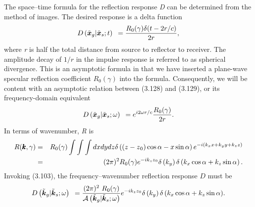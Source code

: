 The space--time formula for the reflection response \textit{D} can be determined from the method of images.  The desired response is a delta function
\begin{equation}\text{\textit{$D$}}\left(\tilde{\boldsymbol{x}}_g|\tilde{\boldsymbol{x}}_s;\text{\textit{$t$}}\right)\text{
 }= \frac{\text{\textit{$R$}}_0(\gamma ) \delta (\text{\textit{$t$}}-2\text{\textit{$r$}}/\text{\textit{$c$}})}{2\text{\textit{$r$}}},\end{equation}
where \textit{r} is half the total distance from source to reflector to receiver. The amplitude decay of $1{/}r$ in the impulse response is referred to as spherical divergence. This is an asymptotic formula in that we have inserted a plane-wave specular reflection coefficient
\(R_0(\gamma )\) into the formula. Consequently, we will be content with an asymptotic relation between (3.128) and (3.129), or its frequency-domain
equivalent
\begin{equation}\text{\textit{$D$}}\left(\tilde{\boldsymbol{x}}_g|\tilde{\boldsymbol{x}}_s;\omega
\right)\text{  }=e^{i 2\omega  \text{\textit{$r/c$}}} \frac{\text{\textit{$R$}}_0(\gamma )}{2\text{\textit{$r$}}}.\end{equation}
In terms of wavenumber, \textit{R} is
\begin{eqnarray}
\text{\textit{$R$}}(\pmb{\text{\textit{$k$}}},\gamma ) & = & \text{\textit{$R$}}_0(\gamma )\int \int \int d\text{\textit{$x$}}d\text{\textit{$y$}}d\text{\textit{$z$}}\text{\textit{$
$}}\delta \left(\left(\text{\textit{$z$}}-\text{\textit{$z$}}_0\right)\cos  \alpha -\text{\textit{$x$}}\text{\textit{$ $}}\sin  \alpha \right)e^{-i\left(\text{\textit{$k_xx$}}+\text{\textit{$k_yy$}}\text{\textit{$+$}}\text{\textit{$k_zz$}}\right)}
\nonumber\\
& = & (2\pi )^2\text{\textit{$R$}}_0(\gamma )e^{-i \text{\textit{$k_z$}}\text{\textit{$z$}}_0}\delta \left(\text{\textit{$k_y$}}\right)\delta \left(\text{\textit{$k_x$}}\cos
 \alpha +\text{\textit{$k_z$}}\sin  \alpha \right).
\end{eqnarray}
Invoking (3.103), the frequency--wavenumber reflection response \(D\) must be
\begin{equation}
\text{\textit{$D$}}\left(\tilde{\boldsymbol{k}}_{\text{\textit{$g$}}}|\tilde{\boldsymbol{k}}_{\text{\textit{$s$}}};\omega \right)\text{  }= \frac{ (2\pi )^2\text{  }\text{\textit{$R$}}_0(\gamma )}{\mathcal{A}\left(\tilde{\boldsymbol{k}}_{\text{\textit{$g$}}}|
\tilde{\boldsymbol{k}}_{\text{\textit{$s$}}};\omega
\right)}e^{-i \text{\textit{$k_z$}}\text{\textit{$z$}}_0}\delta \left(\text{\textit{$k_y$}}\right)\delta \left(\text{\textit{$k_x$}}\cos  \alpha
+\text{\textit{$k_z$}}\sin  \alpha \right)\!.\end{equation}
